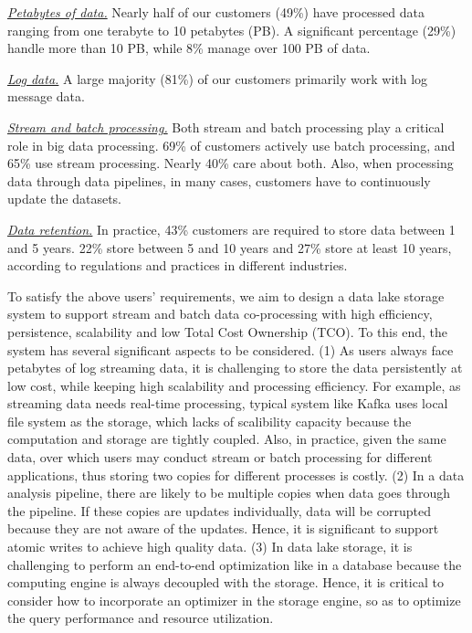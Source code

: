 \noindent \underline{\textit{Petabytes of data.}} Nearly half of our customers (49\%) have processed data ranging from one terabyte to 10 petabytes (PB). A significant percentage (29\%) handle more than 10 PB, while 8\% manage over 100 PB of data.


\noindent \underline{\textit{Log data.}} A large majority (81\%) of our customers primarily work with log message data.

\noindent \underline{\textit{Stream and batch processing.}} Both stream and batch processing play a critical role in big data processing. 69\% of  customers actively use batch processing, and 65\% use stream processing. Nearly 40\%  care about both. 
Also, when processing data through data pipelines, in many cases, customers  have to continuously  update the datasets.

\noindent \underline{\textit{Data retention.}} In practice, 43\% customers are required to store data between 1 and 5 years. 22\% store between 5 and 10 years and 27\% store at least 10 years, according to regulations and practices in different industries.


To satisfy the above users' requirements, we aim to design a data lake storage system to support stream and batch data co-processing with high efficiency, persistence, scalability and low Total Cost Ownership (TCO). To this end, the system has several significant aspects  to be considered. (1) As users always face petabytes of log streaming data, it is challenging to store the data persistently at low cost, while keeping high scalability and processing efficiency. For example, as streaming data needs real-time processing,  typical system like Kafka uses local file system as the storage, which lacks of scalibility capacity because the computation and storage are tightly coupled. Also, in practice, given the same data, over which users may conduct stream or batch processing for different applications, thus storing two copies for different processes is costly.
(2) In a data analysis pipeline, there are likely to be multiple copies when data goes through the pipeline. If these copies are updates individually, data  will be corrupted because   they are not aware of the updates.   
 Hence, it is significant to support atomic writes to achieve high quality data.
(3) In data lake storage,  it is challenging to perform an end-to-end optimization like in a database because the computing engine is always decoupled with the storage. Hence, it is critical to consider how to incorporate an optimizer in the storage engine, so as to optimize the query performance and resource utilization.



